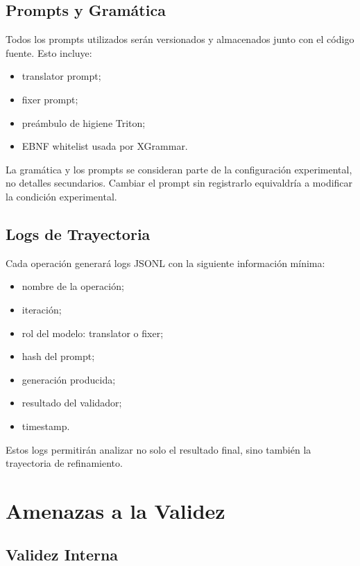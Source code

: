 \documentclass[12pt]{article}
\begin{document}
\subsection{Prompts y Gramática}

Todos los prompts utilizados serán versionados y almacenados junto con el código fuente. Esto incluye:

\begin{itemize}
    \item translator prompt;
    \item fixer prompt;
    \item preámbulo de higiene Triton;
    \item EBNF whitelist usada por XGrammar.
\end{itemize}

La gramática y los prompts se consideran parte de la configuración experimental, no detalles secundarios. Cambiar el prompt sin registrarlo equivaldría a modificar la condición experimental.

\subsection{Logs de Trayectoria}

Cada operación generará logs JSONL con la siguiente información mínima:

\begin{itemize}
    \item nombre de la operación;
    \item iteración;
    \item rol del modelo: translator o fixer;
    \item hash del prompt;
    \item generación producida;
    \item resultado del validador;
    \item timestamp.
\end{itemize}

Estos logs permitirán analizar no solo el resultado final, sino también la trayectoria de refinamiento.

\section{Amenazas a la Validez}

\subsection{Validez Interna}
\end{document}
